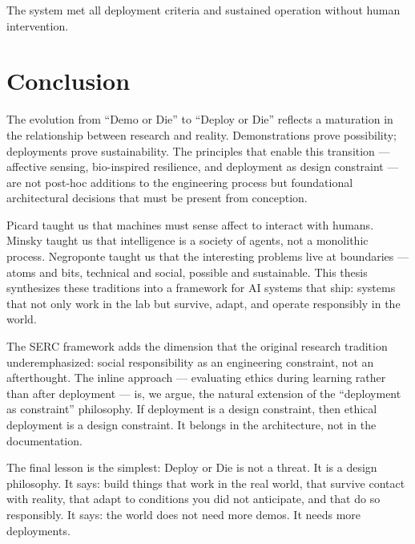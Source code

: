 \documentclass[11pt,a4paper]{article}
\begin{document}
The system met all deployment criteria and sustained operation without human intervention.

\section{Conclusion}

The evolution from ``Demo or Die'' to ``Deploy or Die'' reflects a maturation in the relationship between research and reality. Demonstrations prove possibility; deployments prove sustainability. The principles that enable this transition --- affective sensing, bio-inspired resilience, and deployment as design constraint --- are not post-hoc additions to the engineering process but foundational architectural decisions that must be present from conception.

Picard taught us that machines must sense affect to interact with humans. Minsky taught us that intelligence is a society of agents, not a monolithic process. Negroponte taught us that the interesting problems live at boundaries --- atoms and bits, technical and social, possible and sustainable. This thesis synthesizes these traditions into a framework for AI systems that ship: systems that not only work in the lab but survive, adapt, and operate responsibly in the world.

The SERC framework adds the dimension that the original research tradition underemphasized: social responsibility as an engineering constraint, not an afterthought. The inline approach --- evaluating ethics during learning rather than after deployment --- is, we argue, the natural extension of the ``deployment as constraint'' philosophy. If deployment is a design constraint, then ethical deployment is a design constraint. It belongs in the architecture, not in the documentation.

The final lesson is the simplest: Deploy or Die is not a threat. It is a design philosophy. It says: build things that work in the real world, that survive contact with reality, that adapt to conditions you did not anticipate, and that do so responsibly. It says: the world does not need more demos. It needs more deployments.


\end{document}
